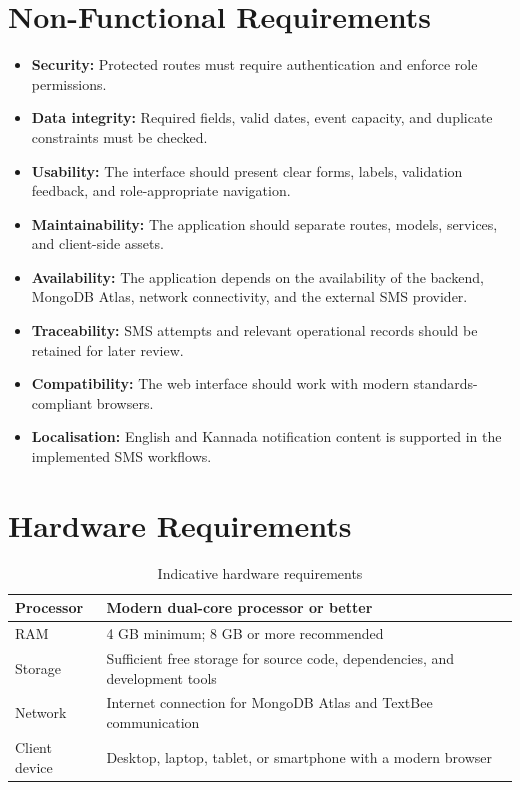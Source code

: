 \documentclass[12pt,a4paper,oneside]{report}
\begin{document}
\section{Non-Functional Requirements}
\begin{itemize}
  \item \textbf{Security:} Protected routes must require authentication and enforce role permissions.
  \item \textbf{Data integrity:} Required fields, valid dates, event capacity, and duplicate constraints must be checked.
  \item \textbf{Usability:} The interface should present clear forms, labels, validation feedback, and role-appropriate navigation.
  \item \textbf{Maintainability:} The application should separate routes, models, services, and client-side assets.
  \item \textbf{Availability:} The application depends on the availability of the backend, MongoDB Atlas, network connectivity, and the external SMS provider.
  \item \textbf{Traceability:} SMS attempts and relevant operational records should be retained for later review.
  \item \textbf{Compatibility:} The web interface should work with modern standards-compliant browsers.
  \item \textbf{Localisation:} English and Kannada notification content is supported in the implemented SMS workflows.
\end{itemize}

\section{Hardware Requirements}
\begin{table}[H]
\centering
\caption{Indicative hardware requirements}
\begin{tabularx}{\textwidth}{|p{4cm}|X|}
\hline
Processor & Modern dual-core processor or better\\ \hline
RAM & 4 GB minimum; 8 GB or more recommended\\ \hline
Storage & Sufficient free storage for source code, dependencies, and development tools\\ \hline
Network & Internet connection for MongoDB Atlas and TextBee communication\\ \hline
Client device & Desktop, laptop, tablet, or smartphone with a modern browser\\ \hline
\end{tabularx}
\end{table}
\end{document}
